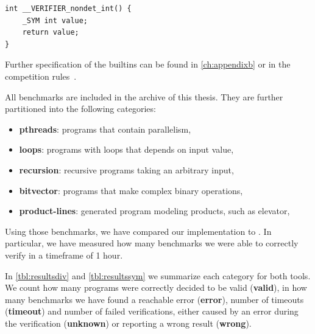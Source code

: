 \begin{verbatim}
int __VERIFIER_nondet_int() {
    _SYM int value;
    return value;
}
\end{verbatim}
Further specification of the \svcomp builtins can be found in
\autoref{ch:appendixb} or in the competition rules~\cite{svcomp}.

All benchmarks are included in the archive of this thesis. They are further
partitioned into the following categories:
\begin{itemize}
    \item \textbf{pthreads}: programs that contain parallelism,
    \item \textbf{loops}: programs with loops that depends on input value,
    \item \textbf{recursion}: recursive programs taking an arbitrary input,
    \item \textbf{bitvector}: programs that make complex binary operations,
    \item \textbf{product-lines}: generated program modeling products, such as
        elevator,
\end{itemize}

Using those benchmarks, we have compared our implementation to \SymDIVINE. In
particular, we have measured how many benchmarks we were able to correctly verify in a
timeframe of 1 hour.

In \autoref{tbl:resultsdiv} and \autoref{tbl:resultssym} we summarize each
category for both tools. We count how many programs were correctly decided to be
valid (\textbf{valid}), in how many benchmarks we have found a reachable error
(\textbf{error}), number of timeouts (\textbf{timeout}) and number of failed
verifications, either caused by an error during the verification (\textbf{unknown})
or reporting a wrong result (\textbf{wrong}).


